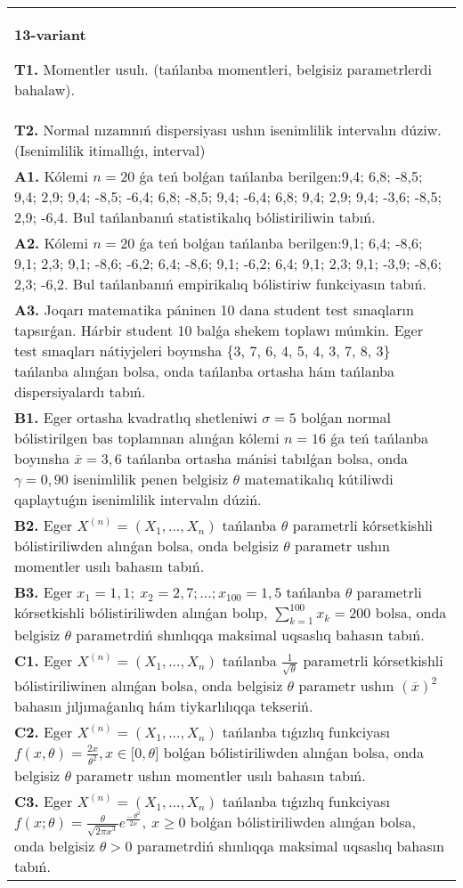 \documentclass{article}
\begin{document}
\begin{tabular}{m{17cm}}
\textbf{13-variant}
\newline

\textbf{T1.} 
Momentler usulı. (tańlanba momentleri, belgisiz parametrlerdi bahalaw).
 \\
\textbf{T2.} 
Normal nızamnıń dispersiyası ushın isenimlilik intervalın dúziw. (Isenimlilik itimallıǵı, interval)
 \\
\textbf{A1.} 
Kólemi \(n = 20\) ǵa teń bolǵan tańlanba berilgen:9,4; 6,8; -8,5; 9,4; 2,9; 9,4; -8,5; -6,4; 6,8; -8,5; 9,4; -6,4; 6,8; 9,4; 2,9; 9,4; -3,6; -8,5; 2,9; -6,4. Bul tańlanbanıń statistikalıq bólistiriliwin tabıń.
 \\
\textbf{A2.} 
Kólemi \(n = 20\) ǵa teń bolǵan tańlanba berilgen:9,1; 6,4; -8,6; 9,1; 2,3; 9,1; -8,6; -6,2; 6,4; -8,6; 9,1; -6,2; 6,4; 9,1; 2,3; 9,1; -3,9; -8,6; 2,3; -6,2. Bul tańlanbanıń empirikalıq bólistiriw funkciyasın tabıń.
 \\
\textbf{A3.} 
Joqarı matematika páninen 10 dana student test sınaqların tapsırǵan. Hárbir student 10 balǵa shekem toplawı múmkin. Eger test sınaqları nátiyjeleri boyınsha \{3, 7, 6, 4, 5, 4, 3, 7, 8, 3\} tańlanba alınǵan bolsa, onda tańlanba ortasha hám tańlanba dispersiyalardı tabıń.
 \\
\textbf{B1.} 
Eger ortasha kvadratlıq shetleniwi \(\sigma = 5\) bolǵan normal bólistirilgen bas toplamnan alınǵan kólemi \(n = 16\) ǵa teń tańlanba boyınsha \(\overline{x} = 3,6\) tańlanba ortasha mánisi tabılǵan bolsa, onda \(\gamma = 0,90\) isenimlilik penen belgisiz \(\theta\) matematikalıq kútiliwdi qaplaytuǵın isenimlilik intervalın dúziń.
 \\
\textbf{B2.} 
Eger \(X^{(n)} = \left( X_{1},...,X_{n} \right)\) tańlanba \(\theta\) parametrli kórsetkishli bólistiriliwden alınǵan bolsa, onda belgisiz \(\theta\) parametr ushın momentler usılı bahasın tabıń.
 \\
\textbf{B3.} 
Eger \(x_{1} = 1,1;\ x_{2} = 2,7;\ldots;x_{100} = 1,5\) tańlanba \(\theta\) parametrli kórsetkishli bólistiriliwden alınǵan bolıp, \(\sum_{k = 1}^{100}x_{k} = 200\) bolsa, onda belgisiz \(\theta\) parametrdiń shınlıqqa maksimal uqsaslıq bahasın tabıń.
 \\
\textbf{C1.} 
Eger \(X^{(n)} = \left( X_{1},...,X_{n} \right)\) tańlanba \(\frac{1}{\sqrt{\theta}}\) parametrli kórsetkishli bólistiriliwinen alınǵan bolsa, onda belgisiz \(\theta\) parametr ushın \((\overline{x})^{2}\) bahasın jıljımaǵanlıq hám tiykarlılıqqa tekseriń.
 \\
\textbf{C2.} 
Eger \(X^{(n)} = \left( X_{1},...,X_{n} \right)\) tańlanba tıǵızlıq funkciyası
$f(x,\theta) = \frac{2x}{\theta^{2}},x \in \lbrack 0,\theta\rbrack$
bolǵan bólistiriliwden alınǵan bolsa, onda belgisiz \(\theta\) parametr ushın momentler usılı bahasın tabıń.
 \\
\textbf{C3.} 
Eger \(X^{(n)} = \left( X_{1},...,X_{n} \right)\) tańlanba tıǵızlıq funkciyası
$f(x;\theta) = \frac{\theta}{\sqrt{2\pi x^{3}}}e^{\frac{- \ \theta^{2}}{2x}},\ x \geq 0$
bolǵan bólistiriliwden alınǵan bolsa, onda belgisiz \(\theta > 0\) parametrdiń shınlıqqa maksimal uqsaslıq bahasın tabıń.
 \\

\end{tabular}
\end{document}

